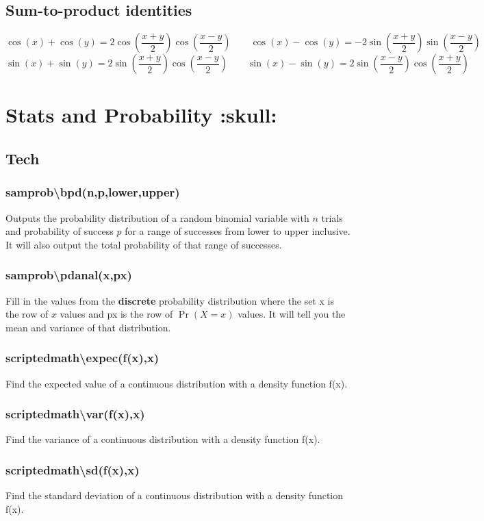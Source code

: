 \documentclass[a4paper,twoside,10pt]{article}
\begin{document}
		\subsection{Sum-to-product identities}
			\[
				\cos(x)+\cos(y)=2\cos\left(\frac{x+y}{2}\right)\cos\left(\frac{x-y}{2}\right) \qquad \cos(x)-\cos(y)=-2\sin\left(\frac{x+y}{2}\right)\sin\left(\frac{x-y}{2}\right)
			\]
			\[
				\sin(x)+\sin(y)=2\sin\left(\frac{x+y}{2}\right)\cos\left(\frac{x-y}{2}\right) \qquad \sin(x)-\sin(y)=2\sin\left(\frac{x-y}{2}\right)\cos\left(\frac{x+y}{2}\right)
			\]
	\section{Stats and Probability :skull:}
		\subsection{Tech}
			\subsubsection{sam\textunderscore prob\textbackslash bpd(n,p,lower,upper)} Outputs the probability distribution of a random binomial variable with $n$ trials and probability of success $p$ for a range of successes from lower to upper inclusive. It will also output the total probability of that range of successes.
			\subsubsection{sam\textunderscore prob\textbackslash pdanal({x},{px})}
			Fill in the values from the \textbf{discrete} probability distribution where the set {x} is the row of $x$ values and {px} is the row of $\Pr(X=x)$ values. It will tell you the mean and variance of that distribution.
			\subsubsection{scriptedmath\textbackslash expec(f(x),x)} Find the expected value of a continuous distribution with a density function f(x).
			\subsubsection{scriptedmath\textbackslash var(f(x),x)} Find the variance of a continuous distribution with a density function f(x).
			\subsubsection{scriptedmath\textbackslash sd(f(x),x)} Find the standard deviation of a continuous distribution with a density function f(x).
\end{document}
